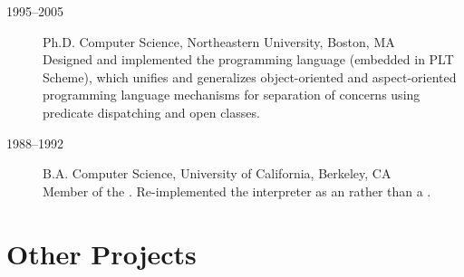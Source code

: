 \documentclass{article}
\begin{document}
\begin{description}
\item[1995--2005] 
{\large Ph.D. Computer Science, Northeastern University}, Boston, MA \\
Designed and implemented the
 programming language
(embedded in PLT Scheme), which unifies and generalizes
object-oriented and aspect-oriented programming language mechanisms
for separation of concerns using predicate dispatching and open
classes.

\item[1988--1992]
{\large B.A. Computer Science, University of California}, Berkeley, CA \\
Member of the
.
Re-implemented the
interpreter as an
rather than a
.
\end{description}




\section*{Other Projects}
\end{document}
